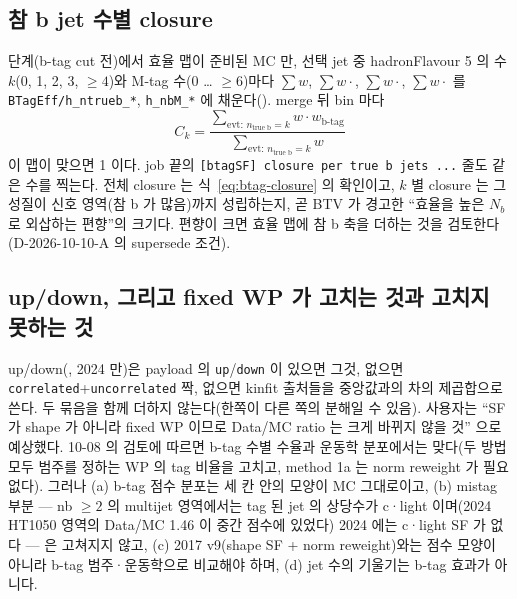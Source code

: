 \subsection{참 b jet 수별 closure}\label{sec:btag-closure}

\HT{} 단계(b-tag cut 전)에서 효율 맵이 준비된 MC 만, 선택 jet 중 hadronFlavour 5 의 수 $k$(0, 1, 2, 3, $\geq 4$)와 M-tag 수(0 … $\geq 6$)마다
$\sum w$, $\sum w\cdot$, $\sum w\cdot$, $\sum w\cdot$ 를 \texttt{BTagEff/h\_ntrueb\_*}, \texttt{h\_nbM\_*}
에 채운다(). merge 뒤 bin 마다
\begin{equation}
  C_k = \frac{\sum_{\text{evt}:\,n_\text{true b}=k} w\cdot w_\text{b-tag}}{\sum_{\text{evt}:\,n_\text{true b}=k} w}
  \label{eq:btag-truebclosure}
\end{equation}
이 맵이 맞으면 1 이다\tagimpl. job 끝의 \texttt{[btagSF] closure per true b jets ...} 줄도 같은 수를 찍는다. 전체 closure 는
식~\eqref{eq:btag-closure} 의 확인이고, $k$ 별 closure 는 그 성질이 신호 영역(참 b 가 많음)까지 성립하는지, 곧 BTV 가 경고한 ``효율을 높은
$N_b$ 로 외삽하는 편향''의 크기다. 편향이 크면 효율 맵에 참 b 축을 더하는 것을 검토한다(D-2026-10-10-A 의 supersede 조건).

\subsection{up/down, 그리고 fixed WP 가 고치는 것과 고치지 못하는 것}\label{sec:btag-fixedwp-limits}

up/down(, 2024 만)은 payload 의 \texttt{up}/\texttt{down} 이 있으면 그것, 없으면 \texttt{correlated}+\texttt{uncorrelated}
짝, 없으면 kinfit 출처들을 중앙값과의 차의 제곱합으로 쓴다. 두 묶음을 함께 더하지 않는다(한쪽이 다른 쪽의 분해일 수 있음)\tagimpl. 사용자는 ``SF 가 shape 가 아니라 fixed WP 이므로 Data/MC ratio 는 크게 바뀌지 않을 것'' 으로
예상했다. 10-08 의 검토에 따르면 b-tag 수별 수율과 운동학 분포에서는 맞다(두 방법 모두 범주를 정하는 WP 의 tag 비율을 고치고, method 1a 는 norm
reweight 가 필요 없다). 그러나 (a) b-tag 점수 분포는 세 칸 안의 모양이 MC 그대로이고, (b) mistag
부분 --- nb $\geq 2$ 의 multijet 영역에서는 tag 된 jet 의 상당수가 c·light 이며(2024 HT1050 영역의 Data/MC 1.46 이 중간 점수에 있었다) 2024 에는
c·light SF 가 없다 --- 은 고쳐지지 않고, (c) 2017 v9(shape SF + norm reweight)와는 점수 모양이 아니라 b-tag 범주·운동학으로 비교해야 하며,
(d) jet 수의 기울기는 b-tag 효과가 아니다.


